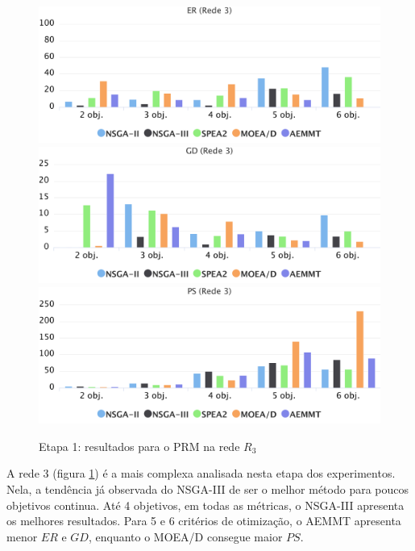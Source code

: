 \begin{figure}[!htbp]
	\caption{Etapa 1: resultados para o PRM na rede $R_3$}
	\label{fig_exp1_mrp_r3}
	\includegraphics[width=1\textwidth]{cap_experimentos/figs/etapa1/er-mrp-r3}
	\includegraphics[width=1\textwidth]{cap_experimentos/figs/etapa1/gd-mrp-r3}
	\includegraphics[width=1\textwidth]{cap_experimentos/figs/etapa1/ps-mrp-r3}
\end{figure}

A rede 3 (figura \ref{fig_exp1_mrp_r3}) é a mais complexa analisada nesta etapa dos experimentos. Nela, a tendência já observada do NSGA-III de ser o melhor método para poucos objetivos continua. Até 4 objetivos, em todas as métricas, o NSGA-III apresenta os melhores resultados. Para 5 e 6 critérios de otimização, o AEMMT apresenta menor $ER$ e $GD$, enquanto o MOEA/D consegue maior $PS$.

